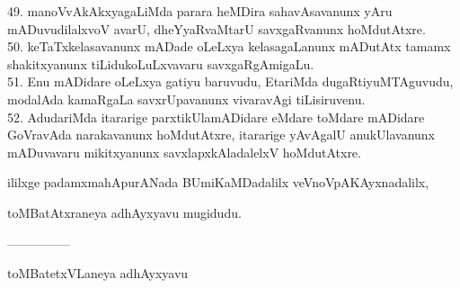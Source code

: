 \documentclass{article}
\begin{document}
49. manoVvAkAkxyagaLiMda parara heMDira sahavAsavanunx yAru mADuvudilalxvoV avarU, dheYyaRvaMtarU savxgaRvanunx hoMdutAtxre.\\
50. keTaTxkelasavanunx mADade oLeLxya kelasagaLanunx mADutAtx tamamx shakitxyanunx tiLidukoLuLxvavaru savxgaRgAmigaLu.\\
51. Enu mADidare oLeLxya gatiyu baruvudu, EtariMda dugaRtiyuMTAguvudu, modalAda kamaRgaLa savxrUpavanunx vivaravAgi tiLisiruvenu.\\
52. AdudariMda itararige parxtikUlamADidare eMdare toMdare mADidare GoVravAda narakavanunx hoMdutAtxre, itararige yAvAgalU anukUlavanunx mADuvavaru mikitxyanunx savxlapxkAladalelxV hoMdutAtxre.

\begin{center}
ililxge padamxmahApurANada BUmiKaMDadalilx veVnoVpAKAyxnadalilx,
\end{center}

\begin{center}
toMBatAtxraneya adhAyxyavu mugidudu.
\end{center}

\begin{center}
---------------
\end{center}

\begin{center}
toMBatetxVLaneya adhAyxyavu
\end{center}
\end{document}
